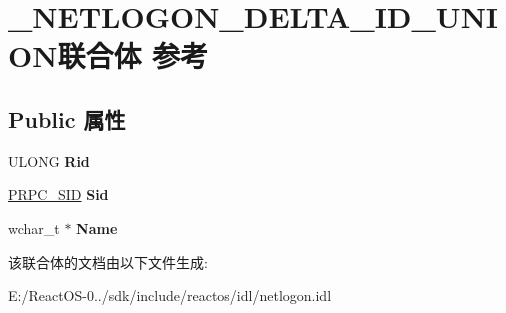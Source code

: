 \hypertarget{union___n_e_t_l_o_g_o_n___d_e_l_t_a___i_d___u_n_i_o_n}{}\section{\+\_\+\+N\+E\+T\+L\+O\+G\+O\+N\+\_\+\+D\+E\+L\+T\+A\+\_\+\+I\+D\+\_\+\+U\+N\+I\+O\+N联合体 参考}
\label{union___n_e_t_l_o_g_o_n___d_e_l_t_a___i_d___u_n_i_o_n}
\subsection*{Public 属性}
\begin{DoxyCompactItemize}
\item 
\mbox{\label{union___n_e_t_l_o_g_o_n___d_e_l_t_a___i_d___u_n_i_o_n_a2d71e8a2157cb03047bc1adce554d2c0}} 
U\+L\+O\+NG {\bfseries Rid}
\item 
\mbox{\label{union___n_e_t_l_o_g_o_n___d_e_l_t_a___i_d___u_n_i_o_n_a4bd7043b15c37fa0d925a5d0694bbc35}} 
\hyperlink{struct___r_p_c___s_i_d}{P\+R\+P\+C\+\_\+\+S\+ID} {\bfseries Sid}
\item 
\mbox{\label{union___n_e_t_l_o_g_o_n___d_e_l_t_a___i_d___u_n_i_o_n_a44bf685c85f37410b117e997b90dce5e}} 
wchar\+\_\+t $\ast$ {\bfseries Name}
\end{DoxyCompactItemize}


该联合体的文档由以下文件生成\+:\begin{DoxyCompactItemize}
\item 
E\+:/\+React\+O\+S-\/0../sdk/include/reactos/idl/netlogon.\+idl\end{DoxyCompactItemize}
